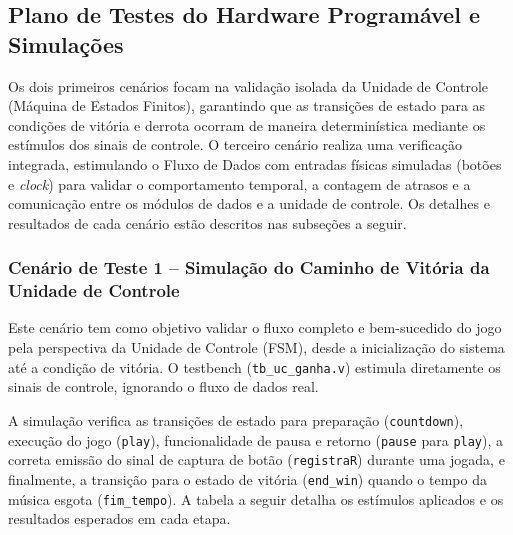 \documentclass[a4paper,12pt,twoside]{article}
\begin{document}
\subsection{Plano de Testes do Hardware Programável e
  Simulações}\label{plano-de-testes-do-hardware-programavel-e-simulacoes}


  Os dois primeiros cenários focam na validação isolada da Unidade de Controle (Máquina de Estados Finitos),
  garantindo que as transições de estado para as condições de vitória e derrota ocorram de maneira
  determinística mediante os estímulos dos sinais de controle. O terceiro cenário realiza uma verificação
  integrada, estimulando o Fluxo de Dados com entradas físicas simuladas (botões e \textit{clock}) para
  validar o comportamento temporal, a contagem de atrasos e a comunicação entre os módulos de dados e a
  unidade de controle. Os detalhes e resultados de cada cenário estão descritos nas subseções a seguir.

  \subsubsection{Cenário de Teste 1 -- Simulação do Caminho de Vitória da Unidade de
  Controle}\label{cenario-de-teste-x-simulacao-vitoria}


  Este cenário tem como objetivo validar o fluxo completo e bem-sucedido do jogo pela perspectiva da Unidade
  de Controle (FSM), desde a inicialização do sistema até a condição de vitória. O testbench
  (\texttt{tb\_uc\_ganha.v}) estimula diretamente os sinais de controle, ignorando o fluxo de dados real.


  A simulação verifica as transições de estado para preparação (\texttt{countdown}), execução do jogo
  (\texttt{play}), funcionalidade de pausa e retorno (\texttt{pause} para \texttt{play}), a correta emissão do
  sinal de captura de botão (\texttt{registraR}) durante uma jogada, e finalmente, a transição para o estado
  de vitória (\texttt{end\_win}) quando o tempo da música esgota (\texttt{fim\_tempo}). A tabela a seguir
  detalha os estímulos aplicados e os resultados esperados em cada etapa.
\end{document}
